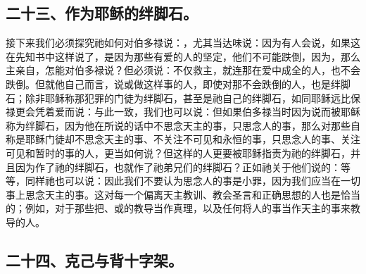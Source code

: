 
\subsection{二十三、作为耶稣的绊脚石。}

接下来我们必须探究祂如何对伯多禄说：，尤其当达味说：因为有人会说，如果这在先知书中这样说了，是因为那些有爱的人的坚定，他们不可能跌倒，因为，那么主亲自，怎能对伯多禄说？但必须说：不仅救主，就连那在爱中成全的人，也不会跌倒。但就他自己而言，说或做这样事的人，即使对那不会跌倒的人，也是绊脚石；除非耶稣称那犯罪的门徒为绊脚石，甚至是祂自己的绊脚石，如同耶稣远比保禄更会凭着爱而说：与此一致，我们也可以说：但如果伯多禄当时因为说而被耶稣称为绊脚石，因为他在所说的话中不思念天主的事，只思念人的事，那么对那些自称是耶稣门徒却不思念天主的事、不关注不可见和永恒的事，只思念人的事、关注可见和暂时的事的人，更当如何说？但这样的人更要被耶稣指责为祂的绊脚石，并且因为作了祂的绊脚石，也就作了祂弟兄们的绊脚石？正如祂关于他们说的：等等，同样祂也可以说：因此我们不要认为思念人的事是小罪，因为我们应当在一切事上思念天主的事。这对每一个偏离天主教训、教会圣言和正确思想的人也是恰当的；例如，对于那些把、或的教导当作真理，以及任何将人的事当作天主的事来教导的人。\par


\subsection{二十四、克己与背十字架。}

